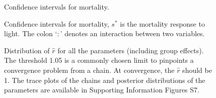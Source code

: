 \documentclass[letterpaper, 12pt]{article}
\newcommand {\s}{{s}^{*}}
\begin{document}
\begin{figure}
	\centering
	
	\caption{Confidence intervals for mortality. \label{fig::confInt_m_2}}
\end{figure}

\begin{figure}
	\centering
	
	\caption{Confidence intervals for mortality, $ \s $ is the mortality response to light. The colon `$ : $' denotes an interaction between two variables. \label{fig::confInt_m_3}}
\end{figure}

\begin{figure}[h]
	\centering
	
	\caption{Distribution of $ \hat{r} $ for all the parameters (including group effects). The threshold 1.05 is a commonly chosen limit to pinpoints a convergence problem from a chain. At convergence, the $ \hat{r} $ should be 1. The trace plots of the chains and posterior distributions of the parameters are available in Supporting Information Figures S7. \label{fig::rhat_conv}}
\end{figure}
\end{document}
